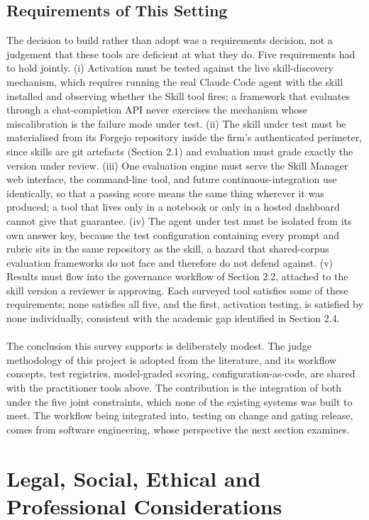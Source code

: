 \subsection{Requirements of This Setting}
The decision to build rather than adopt was a requirements decision, not a judgement that these tools are deficient at what they do. Five requirements had to hold jointly. (i) Activation must be tested against the live skill-discovery mechanism, which requires running the real Claude Code agent with the skill installed and observing whether the Skill tool fires; a framework that evaluates through a chat-completion API never exercises the mechanism whose miscalibration is the failure mode under test. (ii) The skill under test must be materialised from its Forgejo repository inside the firm's authenticated perimeter, since skills are git artefacts (Section 2.1) and evaluation must grade exactly the version under review. (iii) One evaluation engine must serve the Skill Manager web interface, the command-line tool, and future continuous-integration use identically, so that a passing score means the same thing wherever it was produced; a tool that lives only in a notebook or only in a hosted dashboard cannot give that guarantee. (iv) The agent under test must be isolated from its own answer key, because the test configuration containing every prompt and rubric sits in the same repository as the skill, a hazard that shared-corpus evaluation frameworks do not face and therefore do not defend against. (v) Results must flow into the governance workflow of Section 2.2, attached to the skill version a reviewer is approving. Each surveyed tool satisfies some of these requirements; none satisfies all five, and the first, activation testing, is satisfied by none individually, consistent with the academic gap identified in Section 2.4.
\\\\
The conclusion this survey supports is deliberately modest. The judge methodology of this project is adopted from the literature, and its workflow concepts, test registries, model-graded scoring, configuration-as-code, are shared with the practitioner tools above. The contribution is the integration of both under the five joint constraints, which none of the existing systems was built to meet. The workflow being integrated into, testing on change and gating release, comes from software engineering, whose perspective the next section examines.

\section{Legal, Social, Ethical and Professional Considerations}
